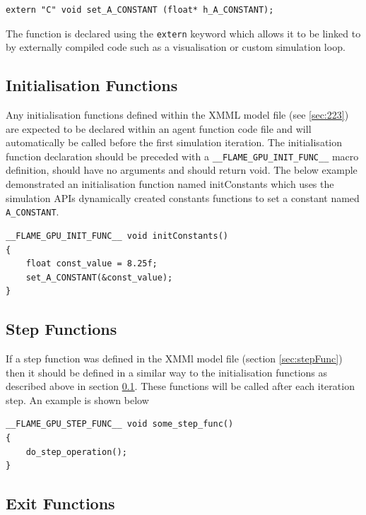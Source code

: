 \documentclass[11pt, a4paper, onecolumn, oneside]{report}
\begin{document}
\begin{lstlisting}[language=C_]
extern "C" void set_A_CONSTANT (float* h_A_CONSTANT);
\end{lstlisting}

The function is declared using the \verb|extern| keyword which allows it to be linked to by externally compiled code such as a visualisation or custom simulation loop.

\subsection{Initialisation Functions}
\label{sec:391}


Any initialisation functions defined within the XMML model file (see \cref{sec:223}) are expected to be declared within an agent function code file and will automatically be called before the first simulation iteration.
The initialisation function declaration should be preceded with a \verb|__FLAME_GPU_INIT_FUNC__| macro definition, should have no arguments and should return void.
The below example demonstrated an initialisation function named initConstants which uses the simulation APIs dynamically created constants functions to set a constant named \verb|A_CONSTANT|. 

\begin{lstlisting}[language=C_]
__FLAME_GPU_INIT_FUNC__ void initConstants()
{
    float const_value = 8.25f;
    set_A_CONSTANT(&const_value);
}
\end{lstlisting}


\subsection{Step Functions}
\label{sec:stepFuncScript}

If a step function was defined in the XMMl model file (section \ref{sec:stepFunc}) then it should be defined in a similar way to the initialisation functions as described above in section \ref{sec:391}. These functions will be called after each iteration step. An example is shown below

\begin{lstlisting}[language=C_]
__FLAME_GPU_STEP_FUNC__ void some_step_func()
{
    do_step_operation();
}
\end{lstlisting}


\subsection{Exit Functions}
\label{sec:exitFuncScript}
\end{document}
